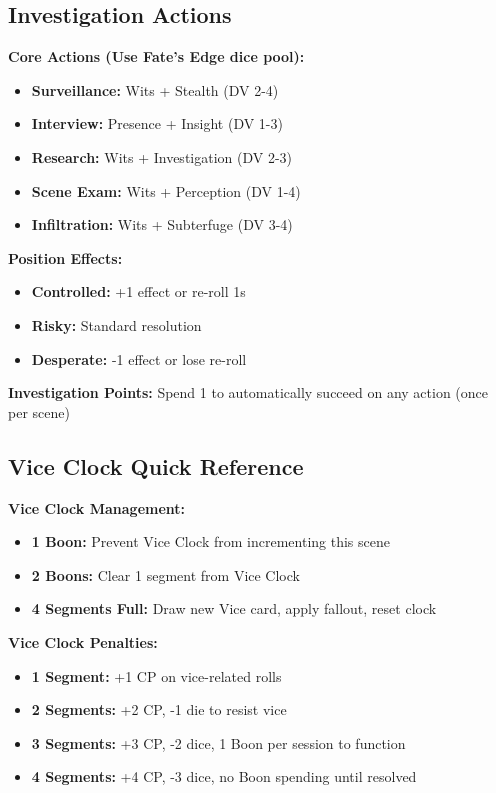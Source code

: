 \documentclass[11pt]{article}
\begin{document}
\subsection{Investigation Actions}

\textbf{Core Actions (Use Fate's Edge dice pool):}
\begin{itemize}
\item \textbf{Surveillance:} Wits + Stealth (DV 2-4)
\item \textbf{Interview:} Presence + Insight (DV 1-3)
\item \textbf{Research:} Wits + Investigation (DV 2-3)
\item \textbf{Scene Exam:} Wits + Perception (DV 1-4)
\item \textbf{Infiltration:} Wits + Subterfuge (DV 3-4)
\end{itemize}

\textbf{Position Effects:}
\begin{itemize}
\item \textbf{Controlled:} +1 effect or re-roll 1s
\item \textbf{Risky:} Standard resolution
\item \textbf{Desperate:} -1 effect or lose re-roll
\end{itemize}

\textbf{Investigation Points:} Spend 1 to automatically succeed on any action (once per scene)

\subsection{Vice Clock Quick Reference}

\textbf{Vice Clock Management:}
\begin{itemize}
\item \textbf{1 Boon:} Prevent Vice Clock from incrementing this scene
\item \textbf{2 Boons:} Clear 1 segment from Vice Clock
\item \textbf{4 Segments Full:} Draw new Vice card, apply fallout, reset clock
\end{itemize}

\textbf{Vice Clock Penalties:}
\begin{itemize}
\item \textbf{1 Segment:} +1 CP on vice-related rolls
\item \textbf{2 Segments:} +2 CP, -1 die to resist vice
\item \textbf{3 Segments:} +3 CP, -2 dice, 1 Boon per session to function
\item \textbf{4 Segments:} +4 CP, -3 dice, no Boon spending until resolved
\end{itemize}
\end{document}
